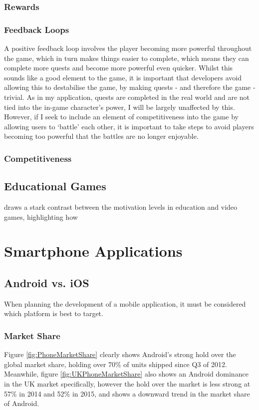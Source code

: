 \subsubsection{Rewards}

\subsubsection{Feedback Loops}
A positive feedback loop involves the player becoming more powerful throughout the game, which in turn makes things easier to complete, which means they can complete more quests and become more powerful even quicker.
Whilst this sounds like a good element to the game, it is important that developers avoid allowing this to destabilise the game, by making quests - and therefore the game - trivial.
As in my application, quests are completed in the real world and are not tied into the in-game character's power, I will be largely unaffected by this.
However, if I seek to include an element of competitiveness into the game by allowing users to `battle' each other, it is important to take steps to avoid players becoming too powerful that the battles are no longer enjoyable.

\subsubsection{Competitiveness}

\subsection{Educational Games}
\cite{Denis:2005:MEG:1178477.1178581} draws a stark contrast between the motivation levels in education and video games, highlighting how 	

\section{Smartphone Applications}


\subsection{Android vs. iOS}
When planning the development of a mobile application, it must be considered which platform is best to target. 

\subsubsection{Market Share}
Figure \ref{fig:PhoneMarketShare} clearly shows Android's strong hold over the global market share, holding over 70\% of units shipped since Q3 of 2012. 
Meanwhile, figure \ref{fig:UKPhoneMarketShare} also shows an Android dominance in the UK market specifically, however the hold over the market is less strong at 57\% in 2014 and 52\% in 2015, and shows a downward trend in the market share of Android.


